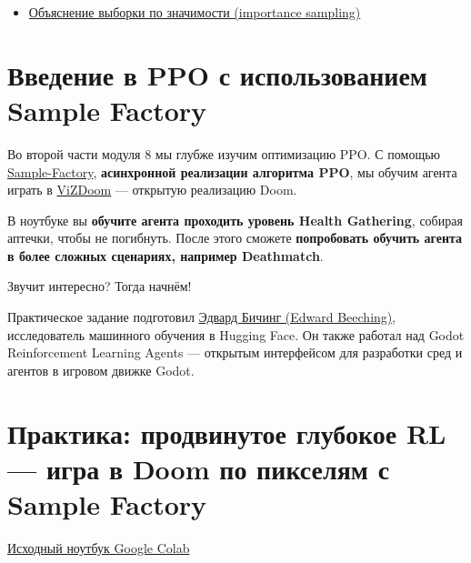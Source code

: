 \documentclass[11pt,a4paper]{article}
\begin{document}
\begin{itemize}
\tightlist
\item
  \href{https://youtu.be/C3p2wI4RAi8}{Объяснение выборки по значимости (importance sampling)}
\end{itemize}

\section{Введение в PPO с использованием Sample Factory}\label{introduction-to-ppo-with-sample-factory}


Во второй части модуля 8 мы глубже изучим оптимизацию PPO. С помощью \href{https://samplefactory.dev/}{Sample-Factory}, \textbf{асинхронной реализации алгоритма PPO}, мы обучим агента играть в \href{https://vizdoom.cs.put.edu.pl/}{ViZDoom} --- открытую реализацию Doom.

В ноутбуке вы \textbf{обучите агента проходить уровень Health Gathering}, собирая аптечки, чтобы не погибнуть. После этого сможете \textbf{попробовать обучить агента в более сложных сценариях, например Deathmatch}.


Звучит интересно? Тогда начнём!

Практическое задание подготовил \href{https://twitter.com/edwardbeeching}{Эдвард Бичинг (Edward Beeching)}, исследователь машинного обучения в Hugging Face. Он также работал над Godot Reinforcement Learning Agents --- открытым интерфейсом для разработки сред и агентов в игровом движке Godot.

\section{Практика: продвинутое глубокое RL — игра в Doom по пикселям с Sample Factory}\label{hands-on-advanced-deep-reinforcement-learning.-using-sample-factory-to-play-doom-from-pixels}

\href{https://colab.research.google.com/github/huggingface/deep-rl-class/blob/main/notebooks/unit8/unit8_part2.ipynb}{Исходный ноутбук Google Colab}
\end{document}
